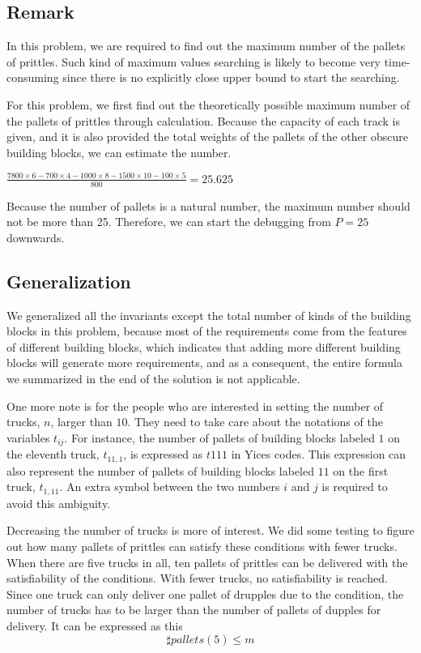 \documentclass[11pt]{article}
\begin{document}
\subsection*{Remark}
In this problem, we are required to find out the maximum number of the pallets of prittles. Such kind of maximum values searching is likely to become very time-consuming since there is no explicitly close upper bound to start the searching.

For this problem, we first find out the theoretically possible maximum number of the pallets of prittles through calculation. Because the capacity of each track is given, and it is also provided the total weights of the pallets of the other obscure building blocks, we can estimate the number.

  $\frac{7800 \times 6 - 700\times4 - 1000\times8 - 1500\times10 - 100\times5}{800} = 25.625$

Because the number of pallets is a natural number, the maximum number should not be more than 25. Therefore, we can start the debugging from $P = 25$ downwards.

\subsection*{Generalization}

We generalized all the invariants except the total number of kinds of the building blocks in this problem, because most of the requirements come from the features of different building blocks, which indicates that adding more different building blocks will generate more requirements, and as a consequent, the entire formula we summarized in the end of the solution is not applicable.

One more note is for the people who are interested in setting the number of trucks, $n$, larger than $10$. They need to take care about the notations of the variables $t_{ij}$. For instance, the number of pallets of building blocks labeled $1$ on the eleventh truck, $t_{11,1}$, is expressed as  $t111$ in Yices codes. This expression can also represent the number of pallets of building blocks labeled $11$ on the first truck, $t_{1,11}$. An extra symbol between the two numbers $i$ and $j$ is required to avoid this ambiguity.

Decreasing the number of trucks is more of interest. We did some testing to figure out how many pallets of prittles can satisfy these conditions with fewer trucks. When there are five trucks in all, ten pallets of prittles can be delivered with the satisfiability of the conditions. With fewer trucks, no satisfiability is reached. Since one truck can only deliver one pallet of drupples due to the condition, the number of trucks has to be larger than the number of pallets of dupples for delivery. It can be expressed as this
\[ \sharp pallets(5) \leq m \]

\newpage



\newpage


\newpage

\end{document}
